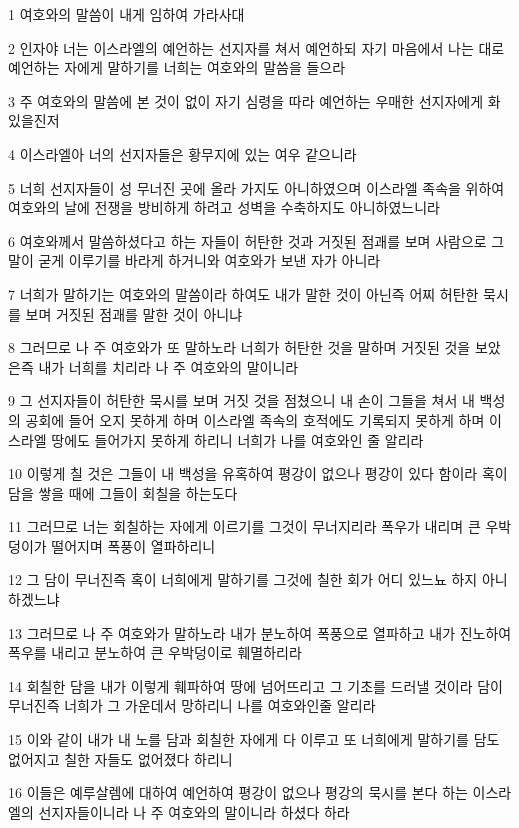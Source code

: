 \par 1 여호와의 말씀이 내게 임하여 가라사대
\par 2 인자야 너는 이스라엘의 예언하는 선지자를 쳐서 예언하되 자기 마음에서 나는 대로 예언하는 자에게 말하기를 너희는 여호와의 말씀을 들으라
\par 3 주 여호와의 말씀에 본 것이 없이 자기 심령을 따라 예언하는 우매한 선지자에게 화 있을진저
\par 4 이스라엘아 너의 선지자들은 황무지에 있는 여우 같으니라
\par 5 너희 선지자들이 성 무너진 곳에 올라 가지도 아니하였으며 이스라엘 족속을 위하여 여호와의 날에 전쟁을 방비하게 하려고 성벽을 수축하지도 아니하였느니라
\par 6 여호와께서 말씀하셨다고 하는 자들이 허탄한 것과 거짓된 점괘를 보며 사람으로 그 말이 굳게 이루기를 바라게 하거니와 여호와가 보낸 자가 아니라
\par 7 너희가 말하기는 여호와의 말씀이라 하여도 내가 말한 것이 아닌즉 어찌 허탄한 묵시를 보며 거짓된 점괘를 말한 것이 아니냐
\par 8 그러므로 나 주 여호와가 또 말하노라 너희가 허탄한 것을 말하며 거짓된 것을 보았은즉 내가 너희를 치리라 나 주 여호와의 말이니라
\par 9 그 선지자들이 허탄한 묵시를 보며 거짓 것을 점쳤으니 내 손이 그들을 쳐서 내 백성의 공회에 들어 오지 못하게 하며 이스라엘 족속의 호적에도 기록되지 못하게 하며 이스라엘 땅에도 들어가지 못하게 하리니 너희가 나를 여호와인 줄 알리라
\par 10 이렇게 칠 것은 그들이 내 백성을 유혹하여 평강이 없으나 평강이 있다 함이라 혹이 담을 쌓을 때에 그들이 회칠을 하는도다
\par 11 그러므로 너는 회칠하는 자에게 이르기를 그것이 무너지리라 폭우가 내리며 큰 우박덩이가 떨어지며 폭풍이 열파하리니
\par 12 그 담이 무너진즉 혹이 너희에게 말하기를 그것에 칠한 회가 어디 있느뇨 하지 아니하겠느냐
\par 13 그러므로 나 주 여호와가 말하노라 내가 분노하여 폭풍으로 열파하고 내가 진노하여 폭우를 내리고 분노하여 큰 우박덩이로 훼멸하리라
\par 14 회칠한 담을 내가 이렇게 훼파하여 땅에 넘어뜨리고 그 기초를 드러낼 것이라 담이 무너진즉 너희가 그 가운데서 망하리니 나를 여호와인줄 알리라
\par 15 이와 같이 내가 내 노를 담과 회칠한 자에게 다 이루고 또 너희에게 말하기를 담도 없어지고 칠한 자들도 없어졌다 하리니
\par 16 이들은 예루살렘에 대하여 예언하여 평강이 없으나 평강의 묵시를 본다 하는 이스라엘의 선지자들이니라 나 주 여호와의 말이니라 하셨다 하라
